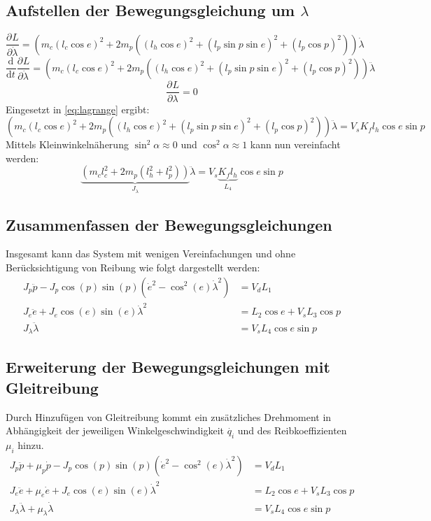 \documentclass{article}
\newcommand{\partiell}[3][]{\frac{\partial^{#1}#2}{\partial{#3}^{#1}}}
\newcommand{\diff}[3][]{\frac{\mathrm{d}^{#1}#2}{\mathrm{d}{#3}^{#1}}}
\begin{document}
\subsection{Aufstellen der Bewegungsgleichung um $\lambda$}
\begin{equation}
\partiell{L}{\dot{\lambda}} = (m_c (l_c \cos e)^2
+ 2 m_p((l_h \cos e)^2 + (l_p \sin p \sin e)^2+(l_p \cos p)^2))\dot{\lambda}
\end{equation}
\begin{equation}
\diff{}{t}\partiell{L}{\dot{\lambda}} = (m_c (l_c \cos e)^2
+ 2 m_p((l_h \cos e)^2 + (l_p \sin p \sin e)^2+(l_p \cos p)^2))\ddot{\lambda}
\end{equation}
\begin{equation}
\partiell{L}{\lambda} = 0
\end{equation}
Eingesetzt in \eqref{eq:lagrange} ergibt:
\begin{equation}
(m_c (l_c \cos e)^2
+ 2 m_p((l_h \cos e)^2 + (l_p \sin p \sin e)^2+(l_p \cos p)^2))\ddot{\lambda} = V_s K_f l_h \cos e \sin p
\end{equation}
Mittels Kleinwinkelnäherung $\sin^2 \alpha \approx 0$ und $\cos^2 \alpha \approx 1$  kann nun vereinfacht werden:
\begin{equation}
\underbrace{(m_c l_c^2 +  2 m_p(l_h^2 + l_p^2))}_{J_\lambda} \ddot{\lambda} = V_s \underbrace{K_f l_h}_{L_4} \cos e \sin p
\end{equation}
\subsection{Zusammenfassen der Bewegungsgleichungen}
Insgesamt kann das System mit wenigen Vereinfachungen und ohne Berücksichtigung von Reibung wie folgt dargestellt werden:
\begin{align}
J_p \ddot{p} - J_p \cos (p) \sin (p) (\dot{e}^2- \cos^2 (e) \dot{\lambda}^2) &= V_d L_1\\
J_e\ddot{e} + J_e \cos (e) \sin (e) \dot{\lambda}^2 
&= L_2 \cos e + V_s L_3 \cos p\\
J_\lambda \ddot{\lambda} &= V_s L_4 \cos e \sin p
\end{align}
\subsection{Erweiterung der Bewegungsgleichungen mit Gleitreibung}
Durch Hinzufügen von Gleitreibung kommt ein zusätzliches Drehmoment in Abhängigkeit der jeweiligen Winkelgeschwindigkeit $\dot{q_i}$ und des Reibkoeffizienten $\mu_i$  hinzu.
\begin{align}
J_p \ddot{p} + \mu_p \dot{p} - J_p \cos (p) \sin (p) (\dot{e}^2- \cos^2 (e) \dot{\lambda}^2) &= V_d L_1\\
J_e\ddot{e} + \mu_e \dot{e} + J_e \cos (e) \sin (e) \dot{\lambda}^2 
&= L_2 \cos e + V_s L_3 \cos p\\
J_\lambda \ddot{\lambda} + \mu_\lambda \dot{\lambda} &= V_s L_4 \cos e \sin p
\end{align}
\end{document}
